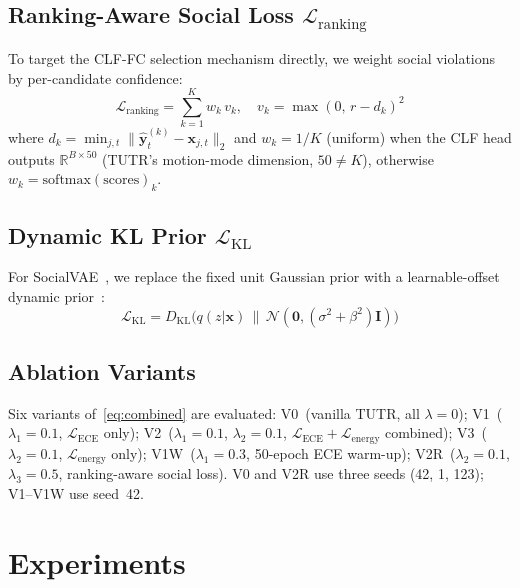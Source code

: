 \documentclass[journal,letterpaper]{IEEEtran}
\begin{document}
\subsection{Ranking-Aware Social Loss \texorpdfstring{$\mathcal{L}_{\text{ranking}}$}{L\_ranking}}

To target the CLF-FC selection mechanism directly, we weight social
violations by per-candidate confidence:
\begin{equation}
  \mathcal{L}_{\text{ranking}} = \sum_{k=1}^{K} w_k\,v_k, \quad
  v_k = \max(0,\,r-d_k)^2
  \label{eq:lranking}
\end{equation}
where $d_k=\min_{j,t}\|\hat{\mathbf{y}}^{(k)}_t-\mathbf{x}_{j,t}\|_2$
and $w_k{=}1/K$ (uniform) when the CLF head outputs
$\mathbb{R}^{B\times 50}$ (TUTR's motion-mode dimension, $50\neq K$),
otherwise $w_k{=}\mathrm{softmax}(\mathrm{scores})_k$.

\subsection{Dynamic KL Prior \texorpdfstring{$\mathcal{L}_{\text{KL}}$}{L\_KL}}

For SocialVAE~\cite{xu2022socialvae}, we replace the fixed unit
Gaussian prior with a learnable-offset dynamic
prior~\cite{zhang2025openworld}:
\begin{equation}
  \mathcal{L}_{\text{KL}} =
  D_{\mathrm{KL}}\!\bigl(q(z|\mathbf{x})\,\|\,
  \mathcal{N}(\mathbf{0},(\sigma^2+\beta^2)\mathbf{I})\bigr)
  \label{eq:lkl}
\end{equation}

\subsection{Ablation Variants}

Six variants of~\eqref{eq:combined} are evaluated:
V0~(vanilla TUTR, all $\lambda{=}0$);
V1~($\lambda_1{=}0.1$, $\mathcal{L}_{\text{ECE}}$ only);
V2~($\lambda_1{=}0.1$, $\lambda_2{=}0.1$,
$\mathcal{L}_{\text{ECE}}+\mathcal{L}_{\text{energy}}$ combined);
V3~($\lambda_2{=}0.1$, $\mathcal{L}_{\text{energy}}$ only);
V1W~($\lambda_1{=}0.3$, 50-epoch ECE warm-up);
V2R~($\lambda_2{=}0.1$, $\lambda_3{=}0.5$,
ranking-aware social loss).
V0 and V2R use three seeds (42, 1, 123); V1--V1W use seed~42.

\section{Experiments}
\label{sec:experiments}
\end{document}
